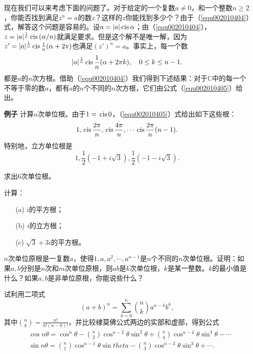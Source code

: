 现在我们可以来考虑下面的问题了。对于给定的一个复数$a \neq 0$，和一个整数$n \ge 2$，你能否找到满足$z^n=a$的数$z$？这样的$z$你能找到多少个？由于（\ref{equ002010404}）式，解答这个问题是容易的。设$a=|a|\,\text{cis}\,{\alpha}$；由（\ref{equ002010404}），$z=|a|^{\frac{1}{n}}\,\text{cis}\,{(\alpha/n)}$就满足要求。但是这个解不是唯一解，因为$z'=|a|^{\frac{1}{n}}\,\text{cis}\,{\frac{1}{n}(\alpha+2\pi)}$也满足$(z')^n=a$。事实上，每一个数
\begin{gather}\label{equ002010405}
|a|^{\frac{1}{n}}\,\text{cis}\,{\frac{1}{n}(\alpha+2\pi{}k)}, \quad 0 \le k \le n-1.
\end{gather}
都是$a$的$n$次方根。借助（\ref{equ002010404}）我们得到下述结果：对于$\mathbb{C}$中的每一个不等于零的数$a$，都有$a$的$n$个不同的$n$次方根，它们由公式（\ref{equ002010405}）给出。

\textbf{例子} \quad 计算$n$次单位根。由于$1=\,\text{cis}\,{0}$，（\ref{equ002010405}）式给出如下这些根：
\[
1,\,\text{cis}\,{\frac{2\pi}{n}},\,\text{cis}\,{\frac{4\pi}{n}},\cdots\,\text{cis}\,{\frac{2\pi}{n}(n-1)}.
\]
特别地，立方单位根是
\[
1, \frac{1}{2}(-1 + i\sqrt{3}),\frac{1}{2}(-1-i\sqrt{3}).
\]

\begin{exercise}
求出6次单位根。
\end{exercise}

\begin{exercise}
计算：
\begin{enumerate}
\item[(a)]$i$的平方根；
\item[(b)]$i$的立方根；
\item[(c)]$\sqrt{3}+3i$的平方根。
\end{enumerate}
\end{exercise}

\begin{exercise}
$n$次单位原根是一复数$a$，使得$1,a,a^2,\cdots,a^{n-1}$是$n$个不同的$n$次单位根。证明：如果$a,b$分别是$n$次和$m$次单位原根，则$ab$是$k$次单位根，$k$是某一整数。$k$的最小值是什么？如果$a,b$是非单位原根，你能说些什么？
\end{exercise}

\begin{exercise}
试利用二项式
\[
(a+b)^n=\sum_{k=0}^{n}{{n \choose k}a^{n-k}b^{k}},
\]
其中${n \choose k}=\frac{n!}{k!(n-k)!}$，并比较棣莫佛公式两边的实部和虚部，得到公式
\[
\begin{aligned}
&\cos{n\theta} = \cos^{n}{\theta} - {n \choose 2}\cos^{n-2}{\theta}\sin^{2}{\theta} + {n \choose 4}\cos^{n-4}{\theta}\sin^{4}{\theta}-\cdots\\
&\sin{n\theta} = {n \choose 1}\cos^{n-1}{\theta}\sin{theta}-{n \choose 3}\cos^{n-3}{\theta}\sin^{3}{\theta}+\cdots.
\end{aligned}
\]
\end{exercise}


